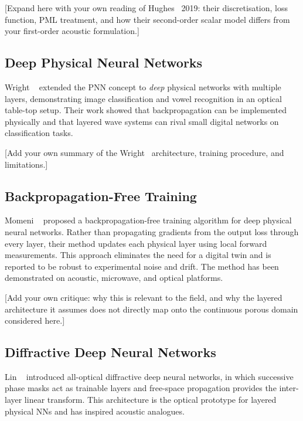 [Expand here with your own reading of Hughes \etal\ 2019: their discretisation, loss function, PML treatment, and how their second-order scalar model differs from your first-order acoustic formulation.]

\subsection{Deep Physical Neural Networks}
\label{subsec:wright_deep}

Wright \etal\ \cite{wright2022deep} extended the PNN concept to \emph{deep} physical networks with multiple layers, demonstrating image classification and vowel recognition in an optical table-top setup. Their work showed that backpropagation can be implemented physically and that layered wave systems can rival small digital networks on classification tasks.

[Add your own summary of the Wright \etal\ architecture, training procedure, and limitations.]

\subsection{Backpropagation-Free Training}
\label{subsec:momeni_bp_free}

Momeni \etal\ \cite{momeni2023backpropagation} proposed a backpropagation-free training algorithm for deep physical neural networks. Rather than propagating gradients from the output loss through every layer, their method updates each physical layer using local forward measurements. This approach eliminates the need for a digital twin and is reported to be robust to experimental noise and drift. The method has been demonstrated on acoustic, microwave, and optical platforms.

[Add your own critique: why this is relevant to the field, and why the layered architecture it assumes does not directly map onto the continuous porous domain considered here.]

\subsection{Diffractive Deep Neural Networks}
\label{subsec:lin_diffractive}

Lin \etal\ \cite{lin2018alloptical} introduced all-optical diffractive deep neural networks, in which successive phase masks act as trainable layers and free-space propagation provides the inter-layer linear transform. This architecture is the optical prototype for layered physical NNs and has inspired acoustic analogues.

